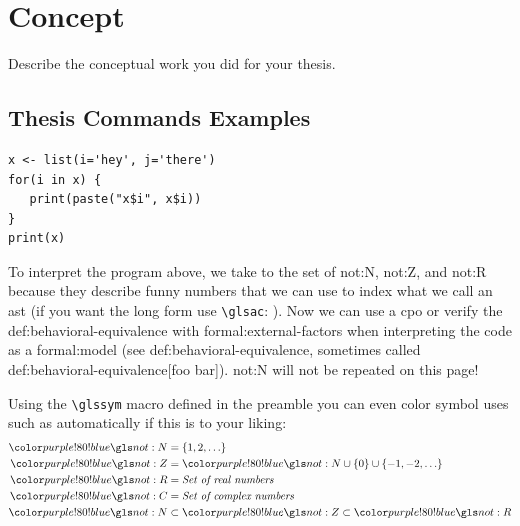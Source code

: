 \setchaptertoc
\chapter{Concept}\label{chp:concept}

\begin{summary}
Describe the conceptual work you did for your thesis.
\end{summary}

\section{Thesis Commands Examples}

\begin{verbatim}
x <- list(i='hey', j='there')
for(i in x) {
   print(paste("x$i", x$i))
}
print(x)
\end{verbatim}


To interpret the program above, we take  to the set of \gls{not:N}, \gls{not:Z}, and \gls{not:R} because they describe funny numbers that we can use to index what we call an \gls{ast} (if you want the long form use \texttt{\textbackslash glsac}: ). Now we can use a \gls{cpo} or verify the \gls{def:behavioral-equivalence} with \glspl{formal:external-factor} when interpreting the code as a \Gls{formal:model} (see \gls{def:behavioral-equivalence}, sometimes called \gls{def:behavioral-equivalence}[foo bar]).
\gls{not:N} will not be repeated on this page!

Using the \texttt{\textbackslash glssym} macro defined in the preamble you can even color symbol uses such as  automatically if this is to your liking:
\begin{align}
    \glssym{not:N} &= \{1, 2, \ldots\} \\
    \glssym{not:Z} &= \glssym{not:N} \cup \{0\} \cup \{-1, -2, \ldots\} \\
    \glssym{not:R} &= \textit{Set of real numbers} \\
    \glssym{not:C} &= \textit{Set of complex numbers} \\
    \glssym{not:N} &\subset \glssym{not:Z} \subset \glssym{not:R} %
\end{align}

